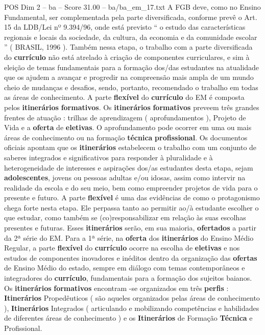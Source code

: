 \begin{textsample}{POS Dim 2 – ba – Score 31.00 – ba/ba\_em\_17.txt}
A FGB deve, como no Ensino Fundamental, ser complementada pela parte diversificada, conforme prevê o Art. 15 da LDB/Lei nº 9.394/96, onde está previsto “ o estudo das características regionais e locais da sociedade, da cultura, da economia e da comunidade escolar ” ( BRASIL, 1996 ).
Também nessa etapa, o trabalho com a parte diversificada do \textbf{currículo} não está atrelado à criação de componentes curriculares, e sim à eleição de temas fundamentais para a formação dos/das estudantes na atualidade que os ajudem a avançar e progredir na compreensão mais ampla de um mundo cheio de mudanças e desafios, sendo, portanto, recomendado o trabalho em todas as áreas de conhecimento.
A parte \textbf{flexível} do \textbf{currículo} do EM é composta pelos \textbf{itinerários} \textbf{formativos}.
Os \textbf{itinerários} \textbf{formativos} preveem três grandes frentes de atuação : trilhas de aprendizagem ( aprofundamentos ), Projeto de Vida e a \textbf{oferta} de \textbf{eletivas}.
O aprofundamento pode ocorrer em uma ou mais áreas de conhecimento ou na formação \textbf{técnica} \textbf{profissional}.
Os documentos oficiais apontam que os \textbf{itinerários} estabelecem o trabalho com um conjunto de saberes integrados e significativos para responder à pluralidade e à heterogeneidade de interesses e aspirações dos/as estudantes desta etapa, sejam \textbf{adolescentes}, jovens ou pessoas adultas e/ou idosas, assim como intervir na realidade da escola e do seu meio, bem como empreender projetos de vida para o presente e futuro.
A parte \textbf{flexível} é uma das evidências de como o protagonismo chega forte nesta etapa.
Ele perpassa tanto ao permitir ao/à estudante escolher o que estudar, como também se (co)responsabilizar em relação às suas escolhas presentes e futuras.
Esses \textbf{itinerários} serão, em sua maioria, \textbf{ofertados} a partir da 2ª série do EM.
Para a 1ª série, na \textbf{oferta} dos \textbf{itinerários} do Ensino Médio Regular, a parte \textbf{flexível} do \textbf{currículo} ocorre na escolha de \textbf{eletivas} e nos estudos de componentes inovadores e inéditos dentro da organização das \textbf{ofertas} de Ensino Médio do estado, sempre em diálogo com temas contemporâneos e integradores do \textbf{currículo}, fundamentais para a formação dos sujeitos baianos.
Os \textbf{itinerários} \textbf{formativos} encontram -se organizados em três \textbf{perfis} : \textbf{Itinerários} Propedêuticos ( são aqueles organizados pelas áreas de conhecimento ), \textbf{Itinerários} Integrados ( articulando e mobilizando competências e habilidades de diferentes áreas de conhecimento ) e os \textbf{Itinerários} de Formação \textbf{Técnica} e Profissional.

\end{textsample}
